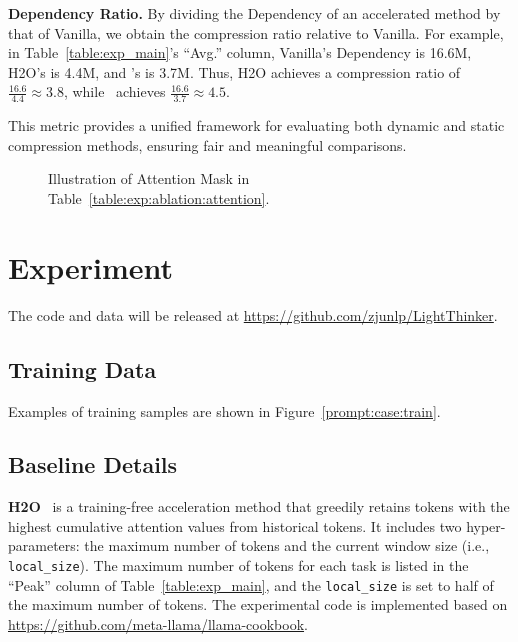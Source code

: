 \textbf{Dependency Ratio.}
By dividing the Dependency of an accelerated method by that of Vanilla, we obtain the compression ratio relative to Vanilla. For example, in Table~\ref{table:exp_main}'s ``Avg.'' column, Vanilla's Dependency is 16.6M, H2O's is 4.4M, and \ours's is 3.7M. 
Thus, H2O achieves a compression ratio of \( \frac{16.6}{4.4} \approx 3.8 \), while \ours~achieves \( \frac{16.6}{3.7} \approx 4.5 \).  

This metric provides a unified framework for evaluating both dynamic and static compression methods, ensuring fair and meaningful comparisons.



\begin{figure}[!htbp] %
    \centering
    \caption{Illustration of Attention Mask in Table~\ref{table:exp:ablation:attention}.}
    \label{fig:app:attention_mode}
\end{figure} 

\section{Experiment}
The code and data will be released at \url{https://github.com/zjunlp/LightThinker}.
\label{sec:app:exp}
\subsection{Training Data}
\label{sec:app:exp:train_data_case}
Examples of training samples are shown in Figure~\ref{prompt:case:train}.

\subsection{Baseline Details}
\label{sec:app:exp:baseline_details}
\textbf{H2O}~\citep{nips23_h2o} is a training-free acceleration method that greedily retains tokens with the highest cumulative attention values from historical tokens. 
It includes two hyper-parameters: the maximum number of tokens and the current window size (i.e., \texttt{local\_size}). 
The maximum number of tokens for each task is listed in the ``Peak'' column of Table~\ref{table:exp_main}, and the \texttt{local\_size} is set to half of the maximum number of tokens. 
The experimental code is implemented based on \url{https://github.com/meta-llama/llama-cookbook}.

